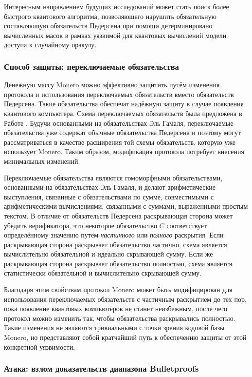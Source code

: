\documentclass{mrl}
\begin{document}
Интересным направлением будущих исследований может стать поиск более быстрого квантового алгоритма, позволяющего нарушить обязательную составляющую обязательств Педерсена при помощи детерминировано вычисленных масок в рамках уязвимой для квантовых вычислений модели доступа к случайному оракулу.

\subsubsection{Способ защиты: переключаемые обязательства}

Денежную массу Monero можно эффективно защитить путём изменения протокола и использования переключаемых обязательств вместо обязательств Педерсена. Такие обязательства обеспечат надёжную защиту в случае появления квантового компьютера. Схема переключаемых обязательств была предложена в Работе \cite{ruffing2017switch}. Будучи основанными на обязательствах Эль Гамаля, переключаемые обязательства уже содержат обычные обязательства Педерсена и  поэтому могут рассматриваться в качестве расширения той схемы обязательств, которую уже использует Monero. Таким образом, модификация протокола потребует внесения минимальных изменений.

Переключаемые обязательства являются гомоморфными обязательствами, основанными на обязательствах Эль Гамаля, и делают арифметические выступления, связанные с обязательствами по сумме, совместимыми с арифметическими вычислениями, связанными с суммами, выраженными простым текстом. В отличие от обязательств Педерсена раскрывающая сторона может убедить верификатора, что некоторое обязательство $C$ соответствует определённому значению путём \textit{частичного} или \textit{полного} раскрытия. Если раскрывающая сторона раскрывает обязательство частично, схема является вычислительно обязательной и идеально скрывающей сумму. Если же раскрывающая сторона раскрывает обязательство полностью, схема является статистически обязательной и вычислительно скрывающей сумму.

Благодаря этим свойствам протокол Monero может быть модифицирован для использования переключаемых обязательств с частичным раскрытием до тех пор, пока появление квантовых компьютеров не станет неизбежным, после чего протокол можно изменить так, чтобы обязательства раскрывались полностью. Такие изменения не являются тривиальными с точки зрения кодовой базы Monero, но представляют собой кратчайший путь к обеспечению защиты от этой конкретной уязвимости.


\subsubsection{Атака: взлом доказательств диапазона Bulletproofs}
\end{document}
